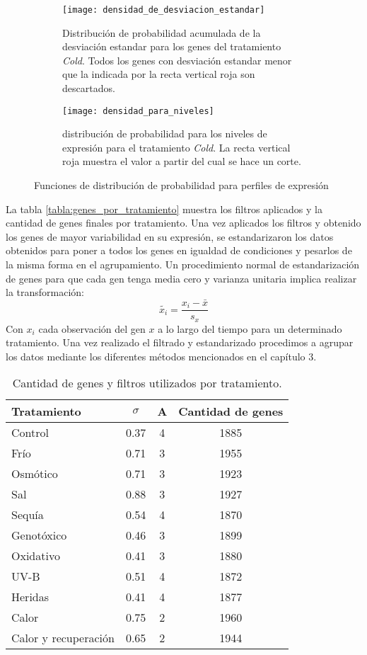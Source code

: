\begin{figure*}[t!]
    \centering
    \begin{subfigure}[t]{0.4\textwidth}
    \centering
    \texttt{[image: densidad\_de\_desviacion\_estandar]}
    \caption{Distribución de probabilidad acumulada de la desviación estandar para los genes del tratamiento \textit{Cold}. Todos los genes con desviación estandar menor que la indicada por la recta vertical roja son descartados.}
    \label{fig:densidad_de_desviacion_estandar}
    \end{subfigure}
    \begin{subfigure}[t]{0.4\textwidth}
    \centering
    \texttt{[image: densidad\_para\_niveles]}
    \caption{distribución de probabilidad para los niveles de expresión para el tratamiento \textit{Cold}. La recta vertical roja muestra el valor a partir del cual se hace un corte.}
    \label{fig:densidad_para_niveles}
    \end{subfigure}
    \caption{Funciones de distribución de probabilidad para perfiles de expresión}
\end{figure*}
La tabla \ref{tabla:genes_por_tratamiento} muestra los filtros aplicados y la cantidad de genes finales por tratamiento.
Una vez aplicados los filtros y obtenido los genes de mayor variabilidad en su expresión, se estandarizaron los datos obtenidos para poner a todos los genes en igualdad de condiciones y pesarlos de la misma forma en el agrupamiento. Un procedimiento normal de estandarización de genes para que cada gen tenga media cero y varianza unitaria implica realizar la transformación:
\begin{equation}
	\tilde{x_i} = \frac{x_i-\bar{x}}{s_x}
\end{equation}
Con $x_i$ cada observación del gen $x$ a lo largo del tiempo para un determinado tratamiento. Una vez realizado el filtrado y estandarizado procedimos a agrupar los datos mediante los diferentes métodos mencionados en el capítulo 3.
\begin{table}[t]
  \centering
\begin{tabular}{| l | c | c | c |}
\hline
Tratamiento & $\sigma$ & A & Cantidad de genes \\
\hline
Control & 0.37 & 4 & 1885 \\
\hline
Frío & 0.71 & 3 & 1955 \\
\hline
Osmótico & 0.71 & 3 & 1923 \\
\hline
Sal & 0.88 & 3 & 1927 \\
\hline
Sequía & 0.54 & 4 & 1870 \\
\hline
Genotóxico & 0.46 & 3 & 1899 \\
\hline
Oxidativo & 0.41 & 3 & 1880 \\
\hline
UV-B & 0.51 & 4 & 1872 \\
\hline
Heridas & 0.41 & 4 & 1877 \\
\hline
Calor & 0.75 & 2 & 1960 \\
\hline
Calor y recuperación & 0.65 & 2 & 1944 \\
\hline                                         
\end{tabular}
\caption{Cantidad de genes y filtros utilizados por tratamiento.}
\label{tab:genes_por_tratamiento}
\end{table}
